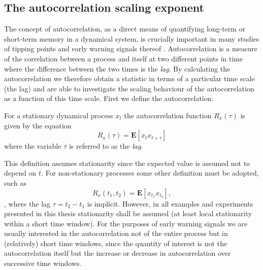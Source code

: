 \subsection{The autocorrelation scaling exponent}
\label{subsec:1D:scaling_exponents:ACF}
{\Red
The concept of autocorrelation, as a direct means of quantifying long-term or short-term memory in a dynamical system, is crucially important in many studies of tipping points and early warning signals thereof \citep{held2004,livina2007,lenton2008,ashwin2012}. Autocorrelation is a measure of the correlation between a process and itself at two different points in time where the difference between the two times is the \emph{lag}. By calculating the autocorrelation we therefore obtain a statistic in terms of a particular time scale (the lag) and are able to investigate the scaling behaviour of the autocorrelation as a function of this time scale. First we define the autocorrelation:

\begin{definition}[Autocorrelation]
	For a stationary dynamical process $x_t$ the autocorrelation function $R_x(\tau)$ is given by the equation
	\begin{equation}
	\label{eqn:methods:auto_correlation_R}
	R_x(\tau) = \mathbf{E}\left[x_t x_{t+\tau}\right]
	\end{equation}
	where the variable $\tau$ is referred to as the \emph{lag}.
\end{definition}

This definition assumes stationarity since the expected value is assumed not to depend on $t$. For non-stationary processes some other definition must be adopted, such as 
\begin{equation}
	R_x(t_1, t_2) = \mathbf{E}\left[x_{t_1} x_{t_2}\right],
\end{equation}
\citep{gubner2006probability}, where the lag $\tau=t_2-t_1$ is implicit. However, in all examples and experiments presented in this thesis stationarity shall be assumed (at least local stationarity within a short time window). For the purposes of early warning signals we are usually interested in the autocorrelation not of the entire process but in (relatively) short time windows, since the quantity of interest is not the autocorrelation itself but the increase or decrease in autocorrelation over successive time windows. 

}
